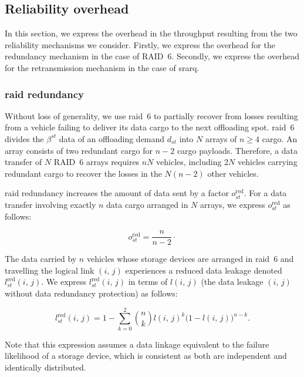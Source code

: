 \subsection{Reliability overhead}
\label{sec:reliability}

In this section, we express the overhead in the throughput resulting from the two reliability mechanisms we consider. Firstly, we express the overhead for the redundancy mechanism in the case of RAID~6. Secondly, we express the overhead for the retransmission mechanism in the case of \acrfull{srarq}.

\subsubsection{\acrshort{raid} redundancy} 

Without loss of generality, we use \acrshort{raid}~6 to partially recover from losses resulting from a vehicle failing to deliver its data cargo to the next offloading spot. \acrshort{raid}~6 divides the $\beta^{st}$ data of an offloading demand $d_{st}$ into $N$ arrays of $n\geq 4$ cargo. An array consists of two redundant cargo for $n-2$ cargo payloads. Therefore, a data transfer of $N$ RAID~6 arrays requires $nN$ vehicles, including $2N$ vehicles carrying redundant cargo to recover the losses in the $N(n-2)$ other vehicles.

\acrshort{raid} redundancy increases the amount of data sent by a factor $o_{st}^{\text{red}}$. For a data transfer involving exactly $n$ data cargo arranged in $N$ arrays, we express $o_{st}^{\text{red}}$ as follows:

\begin{equation}
	o_{st}^{\text{red}} = \frac{n}{n-2}\cdot
    \label{eq:redundancy}
\end{equation}

The data carried by $n$ vehicles whose storage devices are arranged in \acrshort{raid}~6 and travelling the logical link $(i,\,j)$ experiences a reduced data leakage denoted $l^{\text{red}}_{st}(i,\,j)$. We express $l^{\text{red}}_{st}(i,\,j)$ in terms of $l(i,\,j)$ (\ie the data leakage $(i,\,j)$ without data redundancy protection) as follows:

\begin{equation}
	l^{\text{red}}_{st}(i,\,j) = 1 - \sum_{k=0}^{2} \binom{n}{k} l(i,\,j)^{k}\big(1-l(i,\,j)\big)^{n-k}.
\end{equation}

\noindent Note that this expression assumes a data linkage equivalent to the failure likelihood of a storage device, which is consistent as both are independent and identically distributed. 

